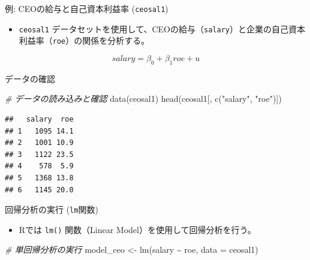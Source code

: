 \documentclass[
  ignorenonframetext,
]{beamer}
\newenvironment{Shaded}{\begin{snugshade}}{\end{snugshade}}
\newcommand{\AttributeTok}[1]{\textcolor[rgb]{0.77,0.63,0.00}{#1}}
\newcommand{\CommentTok}[1]{\textcolor[rgb]{0.56,0.35,0.01}{\textit{#1}}}
\newcommand{\FunctionTok}[1]{\textcolor[rgb]{0.00,0.00,0.00}{#1}}
\newcommand{\NormalTok}[1]{#1}
\newcommand{\OtherTok}[1]{\textcolor[rgb]{0.56,0.35,0.01}{#1}}
\newcommand{\SpecialCharTok}[1]{\textcolor[rgb]{0.00,0.00,0.00}{#1}}
\newcommand{\StringTok}[1]{\textcolor[rgb]{0.31,0.60,0.02}{#1}}
\providecommand{\tightlist}{%
  \setlength{\itemsep}{0pt}\setlength{\parskip}{0pt}}
\begin{document}
\begin{frame}[fragile]{例: CEOの給与と自己資本利益率 (\texttt{ceosal1})}
\protect\hypertarget{ux4f8b-ceoux306eux7d66ux4e0eux3068ux81eaux5df1ux8cc7ux672cux5229ux76caux7387-ceosal1}{}
\begin{itemize}
\tightlist
\item
  \texttt{ceosal1}
  データセットを使用して、CEOの給与（\texttt{salary}）と企業の自己資本利益率（\texttt{roe}）の関係を分析する。
\end{itemize}

\[ salary = \beta_0 + \beta_1 roe + u \]
\end{frame}

\begin{frame}[fragile]{データの確認}
\protect\hypertarget{ux30c7ux30fcux30bfux306eux78baux8a8d}{}
\begin{Shaded}
\begin{Highlighting}[]
\CommentTok{\# データの読み込みと確認}
\FunctionTok{data}\NormalTok{(ceosal1)}
\FunctionTok{head}\NormalTok{(ceosal1[, }\FunctionTok{c}\NormalTok{(}\StringTok{"salary"}\NormalTok{, }\StringTok{"roe"}\NormalTok{)])}
\end{Highlighting}
\end{Shaded}

\begin{verbatim}
##   salary  roe
## 1   1095 14.1
## 2   1001 10.9
## 3   1122 23.5
## 4    578  5.9
## 5   1368 13.8
## 6   1145 20.0
\end{verbatim}
\end{frame}

\begin{frame}[fragile]{回帰分析の実行 (\texttt{lm}関数)}
\protect\hypertarget{ux56deux5e30ux5206ux6790ux306eux5b9fux884c-lmux95a2ux6570}{}
\begin{itemize}
\tightlist
\item
  Rでは \texttt{lm()} 関数（Linear Model）を使用して回帰分析を行う。
\end{itemize}

\begin{Shaded}
\begin{Highlighting}[]
\CommentTok{\# 単回帰分析の実行}
\NormalTok{model\_ceo }\OtherTok{\textless{}{-}} \FunctionTok{lm}\NormalTok{(salary }\SpecialCharTok{\textasciitilde{}}\NormalTok{ roe, }\AttributeTok{data =}\NormalTok{ ceosal1)}
\end{Highlighting}
\end{Shaded}
\end{frame}
\end{document}
